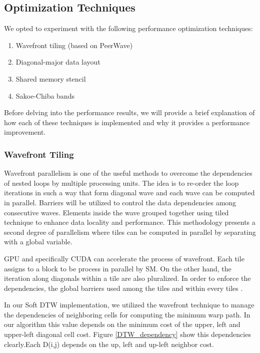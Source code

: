 \documentclass[12pt, letterpaper]{article}
\begin{document}
\subsection{Optimization Techniques}

We opted to experiment with the following performance optimization techniques:

\begin{enumerate}
\item Wavefront tiling (based on PeerWave)
\item Diagonal-major data layout
\item Shared memory stencil
\item Sakoe-Chiba bands
\end{enumerate}

Before delving into the performance results, we will provide a brief explanation
of how each of these techniques is implemented and why it provides a performance
improvement.

\subsubsection{Wavefront Tiling}
Wavefront parallelism is one of the useful methods to overcome the dependencies
of nested loops by multiple processing units. The idea is to re-order the loop
iterations in such a way that form diagonal wave and each wave can be computed
in parallel. Barriers will be utilized to control the data dependencies among
consecutive waves. Elements inside the wave grouped together using tiled
technique to enhance data locality and performance. This methodology presents a
second degree of parallelism where tiles can be computed in parallel by
separating with a global variable.

GPU and specifically CUDA can accelerate the process of wavefront. Each tile
assigns to a block to be process in parallel by SM. On the other hand, the
iteration along diagonals within a tile are also pluralized. In order to enforce
the dependencies, the global barriers used among the tiles and within every
tiles \cite{belviranli_peerwave_2015}.

In our Soft DTW implementation, we utilized the wavefront technique to manage
the dependencies of neighboring cells for computing the minimum warp path. In
our algorithm this value depends on the minimum cost of the upper, left and
upper-left diagonal cell cost. Figure \ref{DTW_dependency} show this
dependencies clearly.Each D(i,j) depends on the up, left and up-left neighbor
cost.
\end{document}
